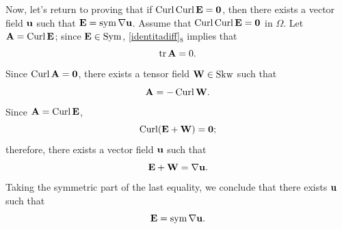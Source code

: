 Now, let's return to proving that if \(\operatorname{Curl} \operatorname{Curl} \mathbf{E} = \mathbf{0}\), then there exists a vector field \(\mathbf{u}\) such that \(\mathbf{E} = \operatorname{sym} \nabla \mathbf{u}\). Assume that \(\operatorname{Curl} \operatorname{Curl} \mathbf{E} = \mathbf{0}\) in \(\Omega\). Let \(\mathbf{A} = \operatorname{Curl} \mathbf{E}\); since \(\mathbf{E} \in \operatorname{Sym}\),
\eqref{identitadiff}$_8$ implies that
\begin{equation}
	\operatorname{tr} \mathbf{A} = 0.
\end{equation}
Since \(\operatorname{Curl} \mathbf{A} = \mathbf{0}\), there exists a tensor field \(\mathbf{W} \in \operatorname{Skw}\) such that
\begin{equation}
	\mathbf{A} = -\operatorname{Curl} \mathbf{W}.
\end{equation}
Since \(\mathbf{A} = \operatorname{Curl} \mathbf{E}\),
\begin{equation}
	\operatorname{Curl} (\mathbf{E} + \mathbf{W}) = \mathbf{0};
\end{equation}
therefore, there exists a vector field \(\mathbf{u}\) such that
\begin{equation}
	\mathbf{E} + \mathbf{W} = \nabla \mathbf{u}.
\end{equation}
Taking the symmetric part of the last equality, we conclude that there exists \(\mathbf{u}\) such that
\begin{equation}
	\mathbf{E} = \operatorname{sym} \nabla \mathbf{u}.
\end{equation}


